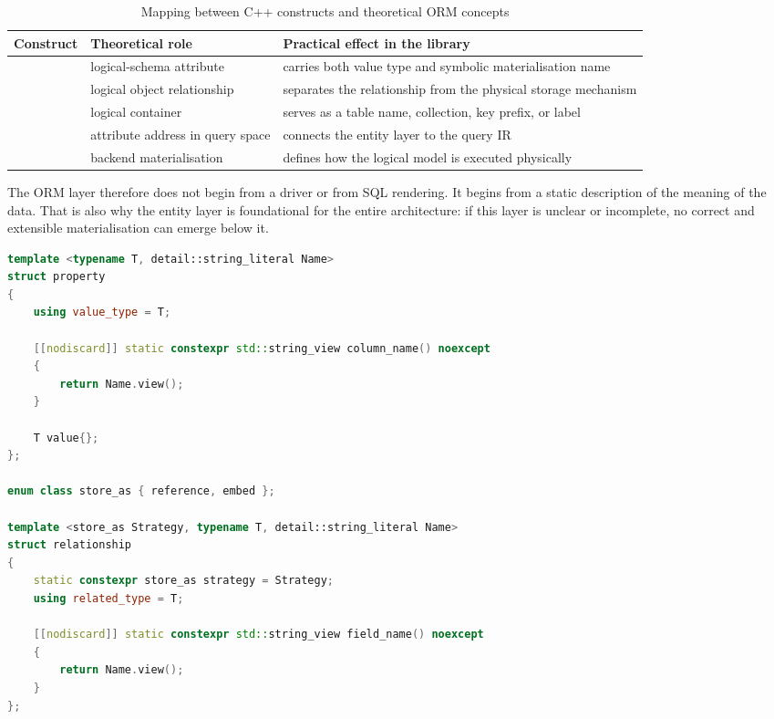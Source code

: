 \begin{table}[H]
\centering
\small
\caption{Mapping between C++ constructs and theoretical ORM concepts}
\label{tab:cpp_to_orm_concepts}
\begin{tabularx}{\textwidth}{L{3.3cm}L{4.0cm}Y}
\toprule
\textbf{Construct} & \textbf{Theoretical role} & \textbf{Practical effect in the library} \\
\midrule
{} & logical-schema attribute & carries both value type and symbolic materialisation name \\
 & logical object relationship & separates the relationship from the physical storage mechanism \\
 & logical container & serves as a table name, collection, key prefix, or label \\
 & attribute address in query space & connects the entity layer to the query IR \\
 & backend materialisation & defines how the logical model is executed physically \\
\bottomrule
\end{tabularx}
\end{table}

The ORM layer therefore does not begin from a driver or from SQL rendering. It begins from a static description of the meaning of the data. That is also why the entity layer is foundational for the entire architecture: if this layer is unclear or incomplete, no correct and extensible materialisation can emerge below it.

\begin{lstlisting}[language=C++,caption={Excerpt from \code{property} and \code{relationship} in the entity layer},label={lst:property_relationship}]
template <typename T, detail::string_literal Name>
struct property
{
    using value_type = T;

    [[nodiscard]] static constexpr std::string_view column_name() noexcept
    {
        return Name.view();
    }

    T value{};
};

enum class store_as { reference, embed };

template <store_as Strategy, typename T, detail::string_literal Name>
struct relationship
{
    static constexpr store_as strategy = Strategy;
    using related_type = T;

    [[nodiscard]] static constexpr std::string_view field_name() noexcept
    {
        return Name.view();
    }
};
\end{lstlisting}

